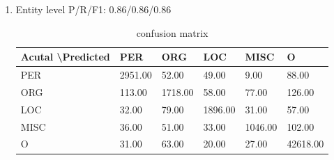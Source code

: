 \documentclass[10pt]{article}
\begin{document}
\begin{enumerate}[label=(\alph*)]
\begin{figure}[ht]
    \qquad
    \qquad        
\end{figure}


\item
Entity level P/R/F1: 0.86/0.86/0.86\\
\begin{table}[h]
	\centering
	\caption{confusion matrix}
	\begin{tabular}{|l|l|l|l|l|l|}
	\hline
	Acutal \textbackslash Predicted & PER     & ORG     & LOC     & MISC    & O        \\ \hline
	PER   & 2951.00 & 52.00   & 49.00   & 9.00   & 88.00    \\ \hline
	ORG   & 113.00  & 1718.00 & 58.00   & 77.00   & 126.00   \\ \hline
	LOC   & 32.00   & 79.00  & 1896.00 & 31.00   & 57.00    \\ \hline
	MISC  & 36.00   & 51.00   & 33.00   & 1046.00 & 102.00   \\ \hline
	O     & 31.00   & 63.00   & 20.00   & 27.00   & 42618.00 \\ \hline
	\end{tabular}
\end{table}

\end{enumerate}
\end{document}

